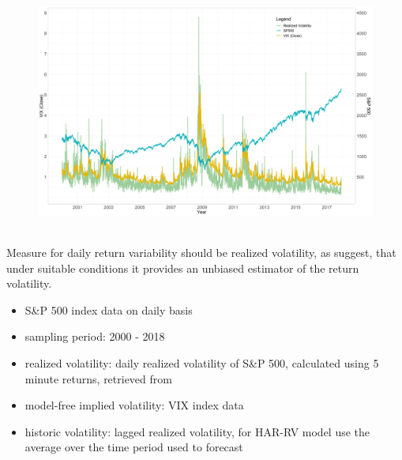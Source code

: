 \begin{figure}[!htbp]
\includegraphics[width=16cm, height=8cm]{pictures/SPandVolandViX.png}
\end{figure}

Measure for daily return variability should be realized volatility, as \citeauthor{andersen2001} suggest, that under suitable conditions it provides an unbiased estimator of the return volatility. 


\begin{itemize}\itemsep0pt
\item S\&P 500 index data on daily basis
\item sampling period: 2000 - 2018
\item realized volatility: daily realized volatility of S\&P 500, calculated using 5 minute returns, retrieved from \citeauthor{heber2009}
\item model-free implied volatility: VIX index data
\item historic volatility: lagged realized volatility, for HAR-RV model use the average over the time period used to forecast
\end{itemize}



